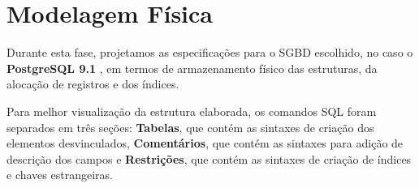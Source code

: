\documentclass[graduacao,brazil]{ThesisPUC}
\begin{document}

\section{Modelagem F\'{i}sica}

Durante esta fase, projetamos as especificações para o SGBD escolhido, no caso o \textbf{PostgreSQL 9.1}
\cite{Postgres}, em termos de armazenamento físico das estruturas, da alocação de registros e dos índices.

Para melhor visualiza\c{c}\~{a}o da estrutura elaborada, os comandos SQL foram separados em tr\^{e}s
se\c{c}\~{o}es: \textbf{Tabelas}, que cont\'{e}m as sintaxes de cria\c{c}\~{a}o dos elementos desvinculados,
\textbf{Coment\'{a}rios}, que cont\'{e}m as sintaxes para adi\c{c}\~{a}o de descri\c{c}\~{a}o dos campos e
\textbf{Restri\c{c}\~{o}es}, que cont\'{e}m as sintaxes de cria\c{c}\~{a}o de \'{i}ndices e chaves
estrangeiras.

\end{document}
